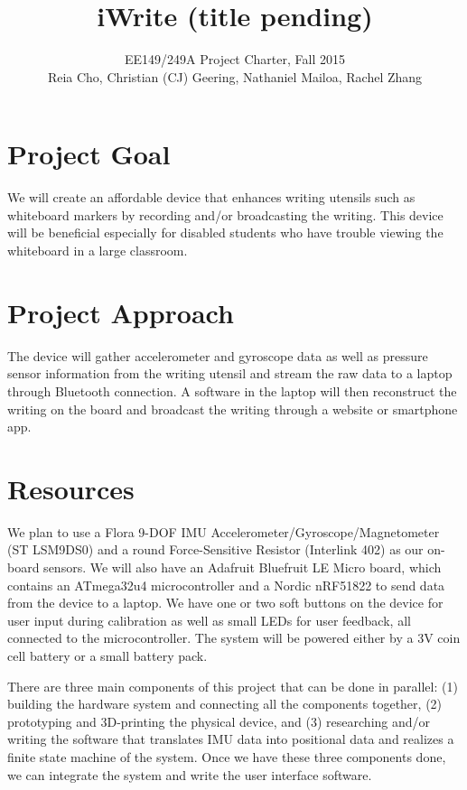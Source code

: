\documentclass[12pt,journal]{IEEEtran}
\begin{document}
\title{iWrite (title pending)}

\author{EE149/249A Project Charter, Fall 2015

Reia Cho, Christian (CJ) Geering, Nathaniel Mailoa, Rachel Zhang}


\maketitle

\section{Project Goal}
We will create an affordable device that enhances writing utensils such as whiteboard markers by recording and/or broadcasting the writing. This device will be beneficial especially for disabled students who have trouble viewing the whiteboard in a large classroom.


\section{Project Approach}
The device will gather accelerometer and gyroscope data as well as pressure sensor information from the writing utensil and stream the raw data to a laptop through Bluetooth connection. A software in the laptop will then reconstruct the writing on the board and broadcast the writing through a website or smartphone app.


\section{Resources}
We plan to use a Flora 9-DOF IMU Accelerometer/Gyroscope/Magnetometer (ST LSM9DS0) and a round Force-Sensitive Resistor (Interlink 402) as our on-board sensors. We will also have an Adafruit Bluefruit LE Micro board, which contains an ATmega32u4 microcontroller and a Nordic nRF51822 to send data from the device to a laptop. We have one or two soft buttons on the device for user input during calibration as well as small LEDs for user feedback, all connected to the microcontroller. The system will be powered either by a 3V coin cell battery or a small battery pack.

There are three main components of this project that can be done in parallel: (1) building the hardware system and connecting all the components together, (2) prototyping and 3D-printing the physical device, and (3) researching and/or writing the software that translates IMU data into positional data and realizes a finite state machine of the system. Once we have these three components done, we can integrate the system and write the user interface software.
\end{document}
